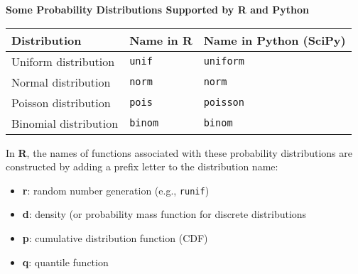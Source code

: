 \documentclass[8pt]{beamer}
\begin{document}
\begin{frame}{\bf Some Probability Distributions Supported by R and Python}
\begin{tabular}{lll}
Distribution & Name in R & Name in Python (SciPy)\\
\hline
Uniform distribution & \texttt{unif} & \texttt{uniform}\\
Normal distribution & \texttt{norm} & \texttt{norm}\\
Poisson distribution & \texttt{pois} & \texttt{poisson}\\
Binomial distribution & \texttt{binom} & \texttt{binom}\\
\end{tabular}
\vspace{3mm}

In {\bf R}, the names of functions associated with these probability distributions are constructed by adding a prefix letter to the distribution name:
\vspace{2mm}

\begin{itemize}
	\item {\bf r}: random number generation (e.g., \texttt{runif})
	\item {\bf d}: density (or probability mass function for discrete distributions
	\item {\bf p}: cumulative distribution function (CDF)
	\item {\bf q}: quantile function
\end{itemize}
\end{frame}
\end{document}
